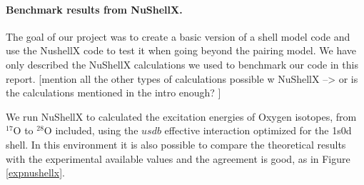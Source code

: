 \documentclass[twoside]{article}
\begin{document}
\paragraph{Benchmark results from NuShellX.} The goal of our project was to create a basic version of a shell model code and use the NushellX code to test it when going beyond the pairing model. We have only described the NuShellX calculations we used to benchmark our code in this report. [mention all the other types of calculations possible w NuShellX --> or is the calculations mentioned in the intro enough? ]

We run NuShellX to calculated the excitation energies of Oxygen isotopes, from $^{17}$O to $^{28}$O included, using the $usdb$ effective interaction optimized for the 1s0d shell. In this environment it is also possible to compare the theoretical results with the experimental available values and the agreement is good, as in Figure \ref{expnushellx}.
\end{document}
